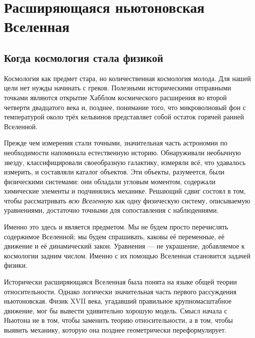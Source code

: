\chapter{Расширяющаяся ньютоновская Вселенная}


\section{Когда космология стала физикой}

Космология как предмет стара, но количественная космология молода. Для нашей цели нет нужды начинать с греков. Полезными историческими отправными точками являются открытие Хабблом космического расширения во второй четверти двадцатого века и, позднее, понимание того, что микроволновый фон с температурой около трёх кельвинов представляет собой остаток горячей ранней Вселенной.

Прежде чем измерения стали точными, значительная часть астрономии по необходимости напоминала естественную историю. Обнаруживали необычную звезду, классифицировали своеобразную галактику, измеряли всё, что удавалось измерить, и составляли каталог объектов. Эти объекты, разумеется, были физическими системами: они обладали угловым моментом, содержали химические элементы и подчинялись механике. Решающий сдвиг состоял в том, чтобы рассматривать \emph{всю Вселенную} как одну физическую систему, описываемую уравнениями, достаточно точными для сопоставления с наблюдениями.

Именно это здесь и является предметом. Мы не будем просто перечислять содержимое Вселенной; мы будем спрашивать, каковы её переменные, её движение и её динамический закон. Уравнения — не украшение, добавляемое к космологии задним числом. Именно с их помощью Вселенная становится задачей физики.

Исторически расширяющаяся Вселенная была понята на языке общей теории относительности. Однако логически значительная часть первого рассуждения ньютоновская. Физик XVII века, угадавший правильное крупномасштабное движение, мог бы вывести удивительно хорошую модель. Смысл начала с Ньютона не в том, чтобы заменить теорию относительности, а в том, чтобы выявить механику, которую она позднее геометрически переформулирует.

